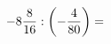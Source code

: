 \documentclass[preview]{standalone}
\begin{document}
\begin{align*}
-8 { 8 \over 16 }  :  \left( - { 4 \over 80 } \right)  =
\end{align*}
\end{document}
